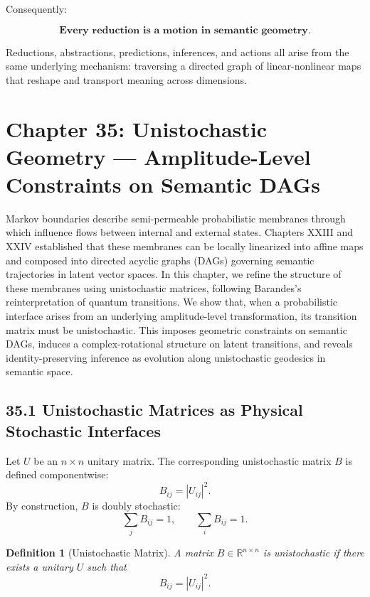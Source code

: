 \documentclass[12pt,letterpaper]{article}
\newtheorem{definition}[theorem]{Definition}
\theoremstyle{remark}
\begin{document}
Consequently:

\[
\textbf{Every reduction is a motion in semantic geometry.}
\]

Reductions, abstractions, predictions, inferences, and actions all arise from the same underlying mechanism:  
traversing a directed graph of linear-nonlinear maps that reshape and transport meaning across dimensions.

\newpage

\section{Chapter 35: Unistochastic Geometry —  
Amplitude-Level Constraints on Semantic DAGs}

Markov boundaries describe semi-permeable probabilistic membranes through which influence flows between internal and external states. Chapters XXIII and XXIV established that these membranes can be locally linearized into affine maps and composed into directed acyclic graphs (DAGs) governing semantic trajectories in latent vector spaces. In this chapter, we refine the structure of these membranes using unistochastic matrices, following Barandes’s reinterpretation of quantum transitions. We show that, when a probabilistic interface arises from an underlying amplitude-level transformation, its transition matrix must be unistochastic. This imposes geometric constraints on semantic DAGs, induces a complex-rotational structure on latent transitions, and reveals identity-preserving inference as evolution along unistochastic geodesics in semantic space.

\subsection{35.1 Unistochastic Matrices as Physical Stochastic Interfaces}

Let $U$ be an $n \times n$ unitary matrix. The corresponding unistochastic matrix $B$ is defined componentwise:
\[
B_{ij} = |U_{ij}|^2.
\]
By construction, $B$ is doubly stochastic:
\[
\sum_j B_{ij} = 1, \qquad \sum_i B_{ij} = 1.
\]

\begin{definition}[Unistochastic Matrix]
A matrix $B \in \mathbb{R}^{n \times n}$ is \emph{unistochastic} if there exists a unitary $U$ such that  
\[
B_{ij} = |U_{ij}|^2.
\]
\end{definition}
\end{document}
